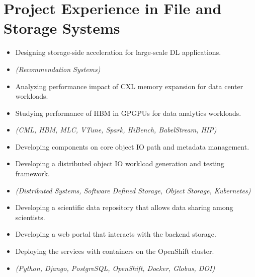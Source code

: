 \section{Project Experience in File and Storage Systems}

\begin{itemize}
    \item {Designing storage-side acceleration for large-scale DL applications.}
    \item {\it\small(Recommendation Systems) }
\end{itemize}

\begin{itemize}
    \item {Analyzing performance impact of CXL memory expansion for data center workloads.}
    \item {Studying performance of HBM in GPGPUs for data analytics workloads.}
    \item {\it\small(CML, HBM, MLC, VTune, Spark, HiBench, BabelStream, HIP) }
\end{itemize}

\begin{itemize}
    \item {Developing components on core object IO path and metadata management.}
    \item {Developing a distributed object IO workload generation and testing framework.}
    \item {\it\small(Distributed Systems, Software Defined Storage, Object Storage, Kubernetes) }
\end{itemize}

\begin{itemize}
    \item {Developing a scientific data repository that allows data sharing among scientists.}
    \item {Developing a web portal that interacts with the backend storage.}
    \item {Deploying the services with containers on the OpenShift cluster.}
    \item {\it\small(Python, Django, PostgreSQL, OpenShift, Docker, Globus, DOI) }
\end{itemize}

